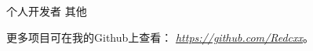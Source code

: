 \begin{cventries}
  \cventry
    {个人开发者} %
    {其他} %
    {} %
    {} %
    {
      \begin{cvitems} %
        \item {更多项目可在我的Github上查看： \href{https://github.com/Redcxx}{\textit{https://github.com/Redcxx}}。}
      \end{cvitems}
    }
  
    


\end{cventries}
